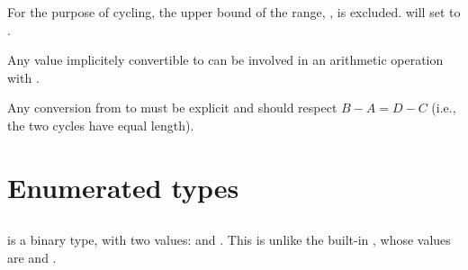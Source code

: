 For the purpose of cycling, the upper bound of the range, ,
is excluded.   will set  to .

Any value implicitely convertible to  can be involved in an
arithmetic operation with .

Any conversion from  to
 must be explicit and should
respect $B - A = D - C$ (i.e., the
two cycles have equal length).


\section{Enumerated types}

\subsection{}

 is a binary type, with two values: 
and .  This is unlike the built-in , whose
values are  and .

